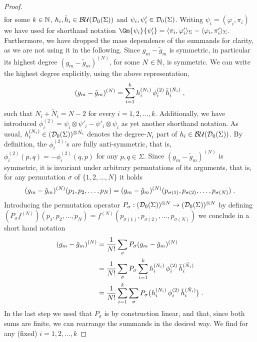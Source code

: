 \begin{proof}
\begin{align}
	\end{align}
	for some $k \in \mathbb{N}$, $h_i, \tilde{h}_i \in \mathcal{BU}(\mathcal{D}_{0}(\Sigma))$ and $\psi_i, \psi'_i \in \mathcal{D}_{0}(\Sigma)$. Writing $\psi_i = (\varphi_i , \pi_i)$ we have used for shorthand notation $\Gm{\psi_i}{ \psi'_i} = \langle \pi_i , \varphi'_i \rangle_\Sigma - \langle \varphi_i , \pi'_i \rangle_\Sigma$. Furthermore, we have dropped the mass dependence of the summands for clarity, as we are not using it in the following. Since $g_m - \tilde{g}_m$ is symmetric, in particular its highest degree $(g_m - \tilde{g}_m)^{(N)}$, for some $N \in \mathbb{N}$, is symmetric. We can write the highest degree explicitly, using the above representation,
	\begin{align}
(g_m - \tilde{g}_m)^{(N)} = \sum_{i=1}^{k} h_i^{(N_i)}\, \phi_i^{(2)}\, \tilde{h}_i^{(\tilde{N}_i)} \;,
	\end{align}
	such that $N_i + \tilde{N}_i = N-2$ for every $i = 1,2,\dots,k$. Additionally, we have introduced $\phi_i^{(2)} =  \psi_i \otimes \psi'_i - \psi'_i \otimes \psi_i $ as yet another shorthand notation. As usual, $h_i^{(N_i)} \in (\mathcal{D}_{0}(\Sigma))^{\otimes N_i}$ denotes the degree-$N_i$ part of $h_i \in \mathcal{BU}(\mathcal{D}_{0}(\Sigma))$. By definition, the $\phi^{(2)}_i$'s are fully anti-symmetric, that is, $\phi^{(2)}_i(p,q) = - \phi^{(2)}_i(q,p)$ for any $p,q \in \Sigma$. Since $(g_m - \tilde{g}_m)^{(N)}$ is symmetric, it is invariant under arbitrary permutations of its arguments, that is, for any permutation $\sigma$ of $\{ 1,2, \dots , N\}$ it holds
	\begin{align}
		(g_m - \tilde{g}_m)^{(N)}(p_1,p_2,\dots,p_N) = (g_m - \tilde{g}_m)^{(N)}(p_{\sigma(1)},p_{\sigma(2)},\dots,p_{\sigma(N)}) \;.
	\end{align}
	Introducing the permutation operator $P_\sigma : (\mathcal{D}_{0}(\Sigma))^{\otimes N} \to (\mathcal{D}_{0}(\Sigma))^{\otimes N}$ by defining $(P_\sigma f^{(N)})(p_1,p_2,\dots,p_N) = f^{(N)}(p_{\sigma(1)},p_{\sigma(2)},\dots,p_{\sigma(N)}) $ we conclude in a short hand notation
	\begin{align}
(g_m - \tilde{g}_m)^{(N)}
&= \frac{1}{N!}\sum\limits_\sigma P_\sigma (g_m - \tilde{g}_m)^{(N)} \notag\\
&= \frac{1}{N!}\sum\limits_\sigma P_\sigma  \sum_{i=1}^{k} h_i^{(N_i)}\, \phi_i^{(2)}\, \tilde{h}_i^{(\tilde{N}_i)}\notag \\
&= \frac{1}{N!}  \sum_{i=1}^{k}  \sum\limits_\sigma P_\sigma \big(  h_i^{(N_i)}\, \phi_i^{(2)}\, \tilde{h}_i^{(\tilde{N}_i)} \big) \;.
	\end{align}
	In the last step we used that $P_\sigma$ is by construction linear, and that, since both sums are finite, we can rearrange the summands in the desired way. We find for any (fixed) $i=1,2,\dots,k$

\end{proof}

